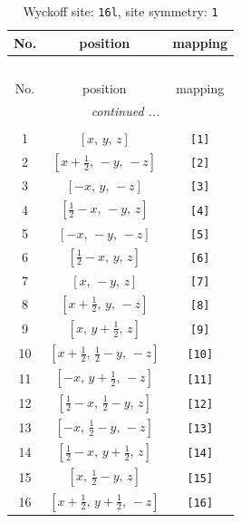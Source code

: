 \documentclass[fleqn,8pt]{jsarticle}
\begin{document}
\begin{longtable}{ccc}
\caption{Wyckoff site: {\tt 16l}, site symmetry: {\tt 1}}
 \\
 \hline \hline
No. & position & mapping \\ \hline \endfirsthead

\multicolumn{2}{l}{\tablename\ \thetable{}} \\
 \hline \hline
No. & position & mapping \\ \hline \endhead

 \hline \hline
\multicolumn{2}{r}{\footnotesize\it continued ...} \\ \endfoot

 \hline \hline
\multicolumn{2}{r}{} \\ \endlastfoot

1 & $\left[ x,\, y,\, z \right]$ & {\tt [1]} \\ \hline
2 & $\left[ x + \frac{1}{2},\, - y,\, - z \right]$ & {\tt [2]} \\ \hline
3 & $\left[ - x,\, y,\, - z \right]$ & {\tt [3]} \\ \hline
4 & $\left[ \frac{1}{2} - x,\, - y,\, z \right]$ & {\tt [4]} \\ \hline
5 & $\left[ - x,\, - y,\, - z \right]$ & {\tt [5]} \\ \hline
6 & $\left[ \frac{1}{2} - x,\, y,\, z \right]$ & {\tt [6]} \\ \hline
7 & $\left[ x,\, - y,\, z \right]$ & {\tt [7]} \\ \hline
8 & $\left[ x + \frac{1}{2},\, y,\, - z \right]$ & {\tt [8]} \\ \hline
9 & $\left[ x,\, y + \frac{1}{2},\, z \right]$ & {\tt [9]} \\ \hline
10 & $\left[ x + \frac{1}{2},\, \frac{1}{2} - y,\, - z \right]$ & {\tt [10]} \\ \hline
11 & $\left[ - x,\, y + \frac{1}{2},\, - z \right]$ & {\tt [11]} \\ \hline
12 & $\left[ \frac{1}{2} - x,\, \frac{1}{2} - y,\, z \right]$ & {\tt [12]} \\ \hline
13 & $\left[ - x,\, \frac{1}{2} - y,\, - z \right]$ & {\tt [13]} \\ \hline
14 & $\left[ \frac{1}{2} - x,\, y + \frac{1}{2},\, z \right]$ & {\tt [14]} \\ \hline
15 & $\left[ x,\, \frac{1}{2} - y,\, z \right]$ & {\tt [15]} \\ \hline
16 & $\left[ x + \frac{1}{2},\, y + \frac{1}{2},\, - z \right]$ & {\tt [16]} \\
\end{longtable}
\end{document}
